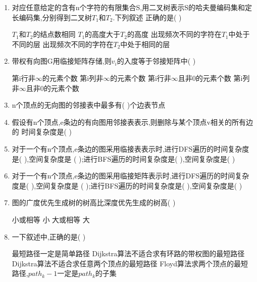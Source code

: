 \documentclass[12pt, a4paper, oneside, UTF8]{ctexbook}
\begin{document}
\begin{enumerate}
    \item \bl 对应任意给定的含有n个字符的有限集合S,用二叉树表示S的哈夫曼编码集和定长编码集,分别得到二叉树$T_1$和$T_2$.下列叙述
    正确的是(    ) 
    \begin{choices}[1]
        \task $T_1$和$T_2$的结点数相同
        \task $T_1$的高度大于$T_2$的高度
        \task 出现频次不同的字符在$T_1$中处于不同的层
        \task 出现频次不同的字符在$T_2$中处于相同的层
    \end{choices}


    \item 带权有向图G用临接矩阵存储,则$v_i$的入度等于邻接矩阵中(    )
    \begin{choices}[2]
        \task 第i行非$\infty$的元素个数
        \task 第i列非$\infty$的元素个数
        \task 第i行非$\infty$且非0的元素个数
        \task 第i列非$\infty$且非0的元素个数
    \end{choices}

    \item n个顶点的无向图的邻接表中最多有(   )个边表节点
    
    \item 假设有n个顶点,e条边的有向图用邻接表表示,则删除与某个顶点v相关的所有边的
    时间复杂度是(    ) 

    \item 对于一个有n个顶点,e条边的图采用临接表表示时,进行DFS遍历的时间复杂度是(   ),空间复杂度是
    (   );进行BFS遍历的时间复杂度是(   ),空间复杂度是(    ) 

    \item 对于一个有n个顶点,e条边的图采用临接矩阵表示时,进行DFS遍历的时间复杂度是(   ),空间复杂度是
    (   );进行BFS遍历的时间复杂度是(   ),空间复杂度是(    ) 

    \item 图的广度优先生成树的树高比深度优先生成的树高(    ) 
    \begin{choices}
        \task 小或相等
        \task 小 
        \task 大或相等 
        \task 大
    \end{choices}

    \item 一下叙述中,正确的是(   ) 
    \begin{choices}[1]
        \task 最短路径一定是简单路径
        \task Dijkstra算法不适合求有环路的带权图的最短路径
        \task Dijkstra算法不适合求任意两个顶点的最短路径 
        \task Floyd算法求两个顶点的最短路径,$path_k-1$一定是$path_k$的子集 
    \end{choices}


\end{enumerate}
\end{document}
